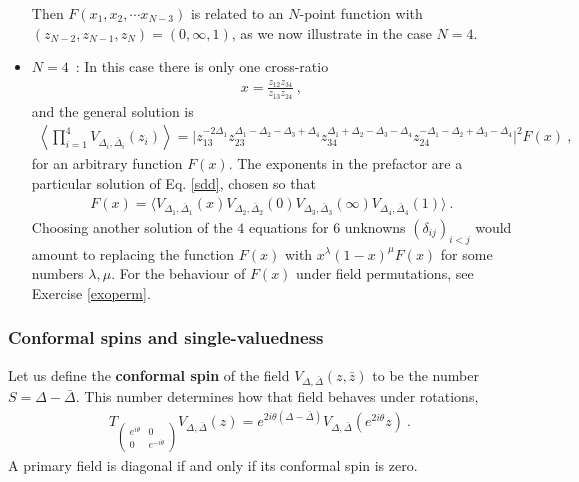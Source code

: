 \documentclass[12pt, a4paper, notitlepage, twoside]{report}
\numberwithin{equation}{section}
\theoremstyle{break}
\begin{document}
\begin{itemize}
Then $F(x_1,x_2,\cdots x_{N-3})$ is related to an $N$-point function with $(z_{N-2},z_{N-1},z_N)=(0,\infty,1)$, as we now illustrate in the case $N=4$.

\item $\boxed{N=4}$\ : In this case there is only one cross-ratio 
\begin{align}
 x=\frac{z_{12}z_{34}}{z_{13}z_{24}}\ ,
\label{xe}
\end{align}
and the general solution is 
\begin{align}
 \left\langle\prod_{i=1}^4 V_{\Delta_i,\bar\Delta_i}(z_i)\right\rangle = \Big| 
 z_{13}^{-2\Delta_1}z_{23}^{\Delta_1-\Delta_2-\Delta_3+\Delta_4}
 z_{34}^{\Delta_1+\Delta_2-\Delta_3-\Delta_4} z_{24}^{-\Delta_1-\Delta_2+\Delta_3-\Delta_4}
 \Big|^2 F(x)\ ,
\label{zgg}
\end{align}
for an arbitrary function $F(x)$.
The exponents in the prefactor are a particular solution of Eq. \eqref{sdd}, chosen so that 
\begin{align}
 F(x) =\Big\langle V_{\Delta_1,\bar\Delta_1}(x)V_{\Delta_2,\bar\Delta_2}(0)V_{\Delta_3,\bar\Delta_3}(\infty) V_{\Delta_4,\bar\Delta_4}(1)\Big\rangle \ .
\label{fx}
\end{align}
Choosing another solution of the $4$ equations for $6$ unknowns $(\delta_{ij})_{i<j}$ would amount to replacing the function $F(x)$ with $x^\lambda (1-x)^\mu F(x)$ for some numbers $\lambda,\mu$. For the behaviour of $F(x)$ under field permutations, see Exercise \ref{exoperm}.
\end{itemize}

\subsubsection{Conformal spins and single-valuedness}

Let us define the \textbf{conformal spin} of the field $V_{\Delta,\bar\Delta}(z,\bar z)$ to be the number $S=\Delta-\bar\Delta$. This number determines how that field behaves under rotations, 
\begin{align}
 T_{\left(\begin{smallmatrix} e^{i\theta} & 0 \\ 0 & e^{-i\theta} \end{smallmatrix}\right)} V_{\Delta,\bar{\Delta}}(z) = e^{2i\theta(\Delta-\bar\Delta)} V_{\Delta,\bar{\Delta}}(e^{2i\theta} z)\ .
\end{align}
A primary field is diagonal if and only if its conformal spin is zero.
\end{document}
